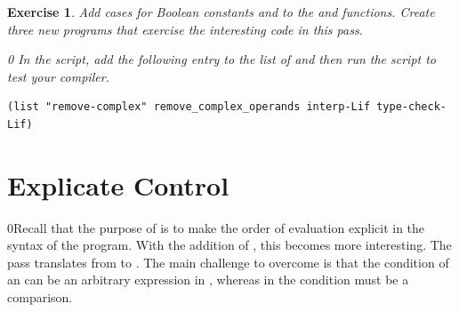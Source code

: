 \documentclass[7x10]{TimesAPriori_MIT}%
\def\racketEd{0}
\providecommand{\BookEdition}{1}
\let\edition\BookEdition
\newcommand{\racket}[1]{{\if\edition\racketEd{#1}\fi}}
\newtheorem{exercise}[theorem]{Exercise}
\numberwithin{theorem}{chapter}
\numberwithin{definition}{chapter}
\numberwithin{equation}{chapter}
\begin{document}
\begin{exercise}\normalfont\normalsize
%
Add cases for Boolean constants and  to the 
and  functions.
%
Create three new \LangIf{} programs that exercise the interesting
code in this pass.
%
{\if\edition\racketEd    
In the  script, add the following entry to the
list of  and then run the script to test your compiler.
\begin{lstlisting}
(list "remove-complex" remove_complex_operands interp-Lif type-check-Lif)
\end{lstlisting}
\fi}
\end{exercise}


\section{Explicate Control}
\label{sec:explicate-control-Lif}

\racket{Recall that the purpose of  is to
  make the order of evaluation explicit in the syntax of the program.
  With the addition of \key{if}, this becomes more interesting.}
%
The  pass translates from \LangIfANF{} to \LangCIf{}.
%
The main challenge to overcome is that the condition of an 
can be an arbitrary expression in \LangIfANF{}, whereas in \LangCIf{} the
condition must be a comparison.
\end{document}
